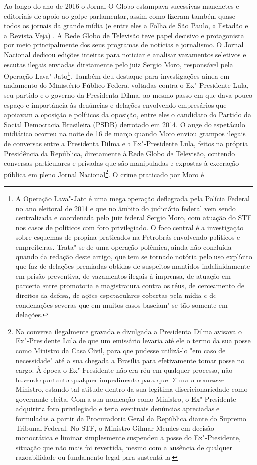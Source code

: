 Ao longo do ano de 2016 o Jornal O Globo estampava sucessivas manchetes
e editoriais de apoio ao golpe parlamentar, assim como fizeram também
quase todos os jornais da grande mídia (e entre eles a Folha de São
Paulo, o Estadão e a Revista Veja) . A Rede Globo de Televisão teve
papel decisivo e protagonista por meio principalmente dos seus programas
de notícias e jornalismo. O Jornal Nacional dedicou edições inteiras
para noticiar e analisar vazamentos seletivos e escutas ilegais enviadas
diretamente pelo juiz Sergio Moro, responsável pela Operação
Lava"-Jato\footnote{A Operação Lava"-Jato é uma mega operação deflagrada
  pela Polícia Federal no ano eleitoral de 2014 e que no âmbito do
  judiciário federal vem sendo centralizada e coordenada pelo juiz
  federal Sergio Moro, com atuação do STF nos casos de políticos com
  foro privilegiado. O foco central é a investigação sobre esquemas de
  propina praticados na Petrobrás envolvendo políticos e empreiteiras.
  Trata"-se de uma operação polêmica, ainda não concluída quando da
  redação deste artigo, que tem se tornado notória pelo uso explícito
  que faz de delações premiadas obtidas de suspeitos mantidos
  indefinidamente em prisão preventiva, de vazamentos ilegais à
  imprensa, de atuação em parceria entre promotoria e magistratura
  contra os réus, de cerceamento de direitos da defesa, de ações
  espetaculares cobertas pela mídia e de condenações severas que em
  muitos casos baseiam"-se tão somente em delações.}. Também deu destaque
para investigações ainda em andamento do Ministério Público Federal
voltadas contra o Ex"-Presidente Lula, seu partido e o governo da
Presidenta Dilma, ao mesmo passo em que dava pouco espaço e importância
às denúncias e delações envolvendo empresários que apoiavam a oposição e
políticos da oposição, entre eles o candidato do Partido da Social
Democracia Brasileira (PSDB) derrotado em 2014. O auge do espetáculo
midiático ocorreu na noite de 16 de março quando Moro enviou grampos
ilegais de conversas entre a Presidenta Dilma e o Ex"-Presidente Lula,
feitos na própria Presidência da República, diretamente à Rede Globo de
Televisão, contendo conversas particulares e privadas que são
manipuladas e expostas à execração pública em pleno Jornal
Nacional\footnote{Na conversa ilegalmente gravada e divulgada a
  Presidenta Dilma avisava o Ex"-Presidente Lula de que um emissário
  levaria até ele o termo da sua posse como Ministro da Casa Civil, para
  que pudesse utilizá-lo "em caso de necessidade" até a sua chegada a
  Brasília para efetivamente tomar posse no cargo. À época o
  Ex"-Presidente não era réu em qualquer processo, não havendo portanto
  qualquer impedimento para que Dilma o nomeasse Ministro, estando tal
  atitude dentro da sua legítima discricionariedade como governante
  eleita. Com a sua nomeação como Ministro, o Ex"-Presidente adquiriria
  foro privilegiado e teria eventuais denúncias apreciadas e formuladas
  a partir da Procuradoria Geral da República diante do Supremo Tribunal
  Federal. No STF, o Ministro Gilmar Mendes em decisão monocrática e
  liminar simplesmente suspendeu a posse do Ex"-Presidente, situação que
  não mais foi revertida, mesmo com a ausência de qualquer razoabilidade
  ou fundamento legal para sustentá-la.}. O crime praticado por Moro é
